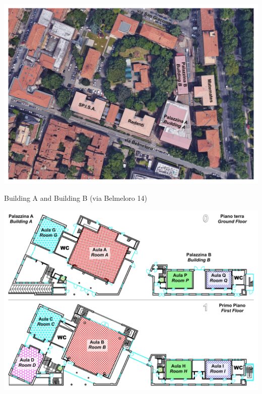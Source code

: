 \includegraphics[scale=0.5]{satellite.pdf}
\newpage
\begin{center}
Building A and Building B (via Belmeloro 14) 
\end{center}
\includegraphics[scale=0.55]{Belmeloro14_floor0_1.pdf}

